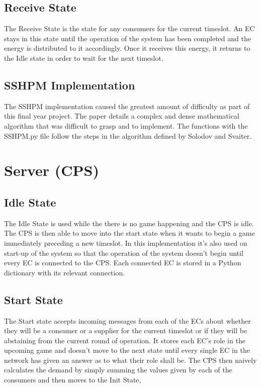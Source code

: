 \documentclass[a4paper, notitlepage]{report}
\begin{document}
\subsection{Receive State}
\label{sec:org8c03037}
The Receive State is the state for any consumers for the current timeslot. An EC
stays in this state until the operation of the system has been completed and the
energy is distributed to it accordingly. Once it receives this energy, it
returns to the Idle state in order to wait for the next timeslot.
\subsection{SSHPM Implementation}
\label{sec:org2b8229a}
The SSHPM implementation caused the greatest amount of difficulty as part of
this final year project. The paper \cite{solodov1999new} details a complex and
dense mathematical algorithm that was difficult to grasp and to implement. The
functions with the SSHPM.py file follow the steps in the algorithm defined by
Solodov and Svaiter.
\section{Server (CPS)}
\label{sec:org94f016c}
\subsection{Idle State}
\label{sec:org59a831d}
The Idle State is used while the there is no game happening and the CPS is idle.
The CPS is then able to move into the start state when it wants to begin a game
immediately preceding a new timeslot. In this implementation it's also used on
start-up of the system so that the operation of the system doesn't begin until
every EC is connected to the CPS. Each connected EC is stored in a Python
dictionary with its relevant connection.
\subsection{Start State}
\label{sec:org1c1d1db}
The Start state accepts incoming messages from each of the ECs about whether
they will be a consumer or a supplier for the current timeslot or if they will
be abstaining from the current round of operation. It stores each EC's role in
the upcoming game and doesn't move to the next state until every single EC in
the network has given an answer as to what their role shall be. The CPS then
naively calculates the demand by simply summing the values given by each of the
consumers and then moves to the Init State, 
\end{document}
